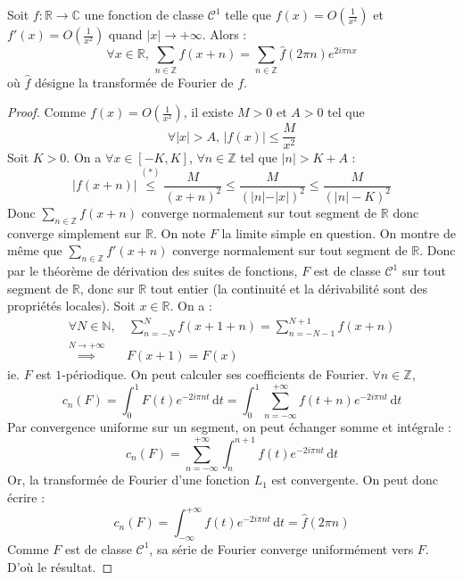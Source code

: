 





  \begin{theorem}
    \label{formule-sommatoire-de-poisson-1}
    Soit $f : \mathbb{R} \rightarrow \mathbb{C}$ une fonction de classe $\mathcal{C}^1$ telle que $f(x) = O \left( \frac{1}{x^2} \right)$ et $f'(x) = O \left( \frac{1}{x^2} \right)$ quand $|x| \longrightarrow +\infty$. Alors :
    \[ \forall x \in \mathbb{R}, \, \sum_{n \in \mathbb{Z}} f(x+n) = \sum_{n \in \mathbb{Z}} \widehat{f}(2 \pi n) e^{2 i \pi n x} \]
    où $\widehat{f}$ désigne la transformée de Fourier de $f$.
  \end{theorem}

  \begin{proof}
    Comme $f(x) = O \left( \frac{1}{x^2} \right)$, il existe $M > 0$ et $A > 0$ tel que
    \[ \forall |x| > A, \, |f(x)| \leq \frac{M}{x^2} \tag{$*$} \]
    Soit $K > 0$. On a $\forall x \in [-K, K]$, $\forall n \in \mathbb{Z}$ tel que $|n| > K + A$ :
    \[ |f(x+n)| \overset{(*)}{\leq} \frac{M}{(x+n)^2} \leq \frac{M}{(\vert n \vert - \vert x \vert)^2} \leq \frac{M}{(|n| - K)^2} \]
    Donc $\sum_{n \in \mathbb{Z}} f(x+n)$ converge normalement sur tout segment de $\mathbb{R}$ donc converge simplement sur $\mathbb{R}$. On note $F$ la limite simple en question.
    \newpar
    On montre de même que $\sum_{n \in \mathbb{Z}} f'(x+n)$ converge normalement sur tout segment de $\mathbb{R}$. Donc par le théorème de dérivation des suites de fonctions, $F$ est de classe $\mathcal{C}^1$ sur tout segment de $\mathbb{R}$, donc sur $\mathbb{R}$ tout entier (la continuité et la dérivabilité sont des propriétés locales).
    \newpar
    Soit $x \in \mathbb{R}$. On a :
    \begin{align*}
      \forall N \in \mathbb{N}, &\, \sum_{n=-N}^N f(x+1+n) = \sum_{n=-N-1}^{N+1} f(x+n) \\
      \overset{N \longrightarrow +\infty}{\implies} & F(x+1) = F(x)
    \end{align*}
    ie. $F$ est $1$-périodique. On peut calculer ses coefficients de Fourier. $\forall n \in \mathbb{Z}$,
    \[ c_n(F) = \int_0^1 F(t) e^{-2i\pi n t} \, \mathrm{d}t = \int_0^1 \sum_{n=-\infty}^{+\infty} f(t+n) e^{-2i\pi n t} \, \mathrm{d}t \]
    Par convergence uniforme sur un segment, on peut échanger somme et intégrale :
    \[ c_n(F) = \sum_{n=-\infty}^{+\infty} \int_n^{n+1} f(t) e^{-2i\pi n t} \, \mathrm{d}t \]
    Or, la transformée de Fourier d'une fonction $L_1$ est convergente. On peut donc écrire :
    \[ c_n(F) = \int_{-\infty}^{+\infty} f(t) e^{-2i\pi n t} \, \mathrm{d}t = \widehat{f}(2\pi n) \]
    Comme $F$ est de classe $\mathcal{C}^1$, sa série de Fourier converge uniformément vers $F$. D'où le résultat.
  \end{proof}

